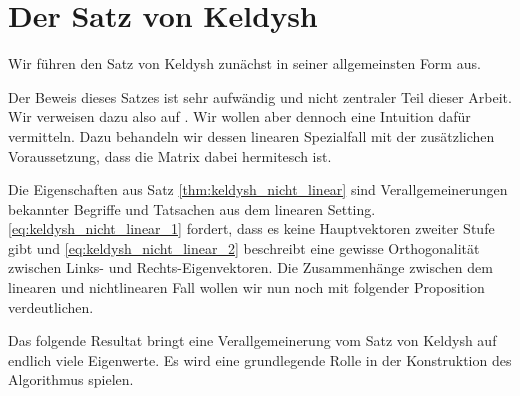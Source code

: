 \section{Der Satz von Keldysh}

Wir führen den Satz von Keldysh zunächst in seiner allgemeinsten Form aus.



Der Beweis dieses Satzes ist sehr aufwändig und nicht zentraler Teil dieser Arbeit.
Wir verweisen dazu also auf \cite{BEYN20123839}.
Wir wollen aber dennoch eine Intuition dafür vermitteln.
Dazu behandeln wir dessen linearen Spezialfall mit der zusätzlichen Voraussetzung, dass die Matrix dabei hermitesch ist.



Die Eigenschaften aus Satz \ref{thm:keldysh_nicht_linear} sind Verallgemeinerungen bekannter Begriffe und Tatsachen aus dem linearen Setting.
\eqref{eq:keldysh_nicht_linear_1} fordert, dass es keine Hauptvektoren zweiter Stufe gibt und \eqref{eq:keldysh_nicht_linear_2} beschreibt eine gewisse Orthogonalität zwischen Links- und Rechts-Eigenvektoren.
Die Zusammenhänge zwischen dem linearen und nichtlinearen Fall wollen wir nun noch mit folgender Proposition verdeutlichen.





% 

% 
% 

Das folgende Resultat bringt eine Verallgemeinerung vom Satz von Keldysh auf endlich viele Eigenwerte.
Es wird eine grundlegende Rolle in der Konstruktion des Algorithmus spielen.



